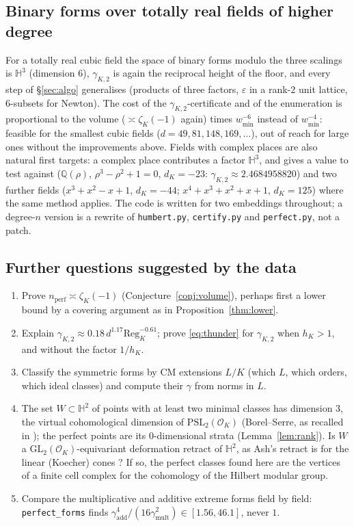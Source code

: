 \documentclass[11pt]{amsart}
\theoremstyle{definition}
\theoremstyle{remark}
\newcommand{\Q}{\mathbb{Q}}
\newcommand{\Hb}{\mathbb{H}}
\newcommand{\OK}{\mathcal{O}_K}
\newcommand{\GL}{\mathrm{GL}}
\newcommand{\PSL}{\mathrm{PSL}}
\newcommand{\Reg}{\mathrm{Reg}_K}
\newcommand{\gK}{\gamma_{K,2}}
\newcommand{\nperf}{n_{\mathrm{perf}}}
\begin{document}
\subsection{Binary forms over totally real fields of higher degree}
For a totally real cubic field the space of binary forms modulo the three scalings is $\Hb^3$
(dimension $6$), $\gamma_{K,2}$ is again the reciprocal height of the floor, and every step of
\S\ref{sec:algo} generalises (products of three factors, $\varepsilon$ in a rank-$2$ unit
lattice, $6$-subsets for Newton).  The cost of the $\gK$-certificate and of the enumeration is
proportional to the volume ($\asymp\zeta_K(-1)$ again) times $w_{\min}^{-6}$ instead of $w_{\min}^{-4}$:
feasible for the smallest cubic fields ($d=49,81,148,169,\dots$), out of reach for large ones
without the improvements above.  Fields with complex places are also natural first targets: a
complex place contributes a factor $\Hb^3$, and \cite{CIO} gives a value to test against
($\Q(\rho)$, $\rho^3-\rho^2+1=0$, $d_K=-23$: $\gK\approx2.4684958820$) and two further fields
($x^3+x^2-x+1$, $d_K=-44$; $x^4+x^3+x^2+x+1$, $d_K=125$) where the same method applies.  The code is written for two embeddings throughout; a degree-$n$
version is a rewrite of \texttt{humbert.py}, \texttt{certify.py} and \texttt{perfect.py}, not a
patch.

\subsection{Further questions suggested by the data}
\begin{enumerate}[leftmargin=*]
\item Prove $\nperf\asymp\zeta_K(-1)$ (Conjecture~\ref{conj:volume}), perhaps first a lower bound by
a covering argument as in Proposition~\ref{thm:lower}.
\item Explain $\gK\approx 0.18\,d^{1.17}\Reg^{-0.61}$; prove \eqref{eq:thunder} for $\gK$ when $h_K>1$, and without the factor $1/h_K$.
\item Classify the symmetric forms by CM extensions $L/K$ (which $L$, which orders, which
ideal classes) and compute their $\gamma$ from norms in $L$.
\item The set $W\subset\Hb^2$ of points with at least two minimal classes has dimension $3$, the
virtual cohomological dimension of $\PSL_2(\OK)$ (Borel--Serre, as recalled in \cite[\S1]{Ash});
the perfect points are its $0$-dimensional strata (Lemma~\ref{lem:rank}).  Is $W$ a
$\GL_2(\OK)$-equivariant deformation retract of $\Hb^2$, as Ash's retract is for the linear
(Koecher) cones \cite{Ash}?  If so, the perfect classes found here are the vertices of a finite cell
complex for the cohomology of the Hilbert modular group.
\item Compare the multiplicative and additive extreme forms field by field: \texttt{perfect\_forms}
finds $\gamma_{\mathrm{add}}^4/(16\gamma_{\mathrm{mult}}^2)\in[1.56,46.1]$, never $1$.
\end{enumerate}
\end{document}
